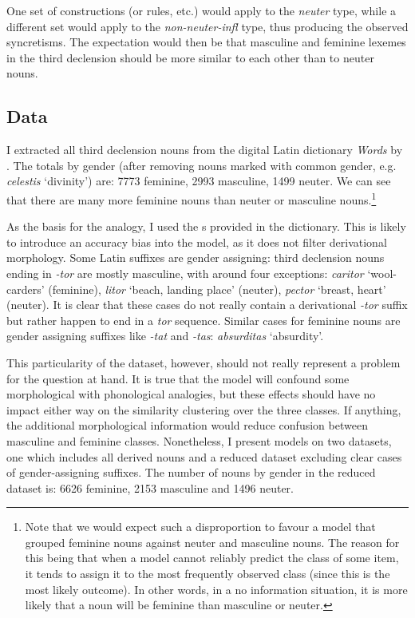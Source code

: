 One set of constructions (or rules, etc.) would apply to the \textit{neuter} type, while a different set would apply to the \textit{non-neuter-infl} type, thus producing the observed syncretisms. The expectation would then be that masculine and feminine lexemes in the third declension should be more similar to each other than to neuter nouns.

\subsection{Data}

I extracted all third declension nouns from the digital Latin dictionary \textit{Words} by \textcite{Whitaker.}. The totals by gender (after removing nouns marked with common gender, e.g. \textit{celestis} `divinity') are: 7773 feminine, 2993 masculine, 1499 neuter. We can see that there are many more feminine nouns than neuter or masculine nouns.\footnote{Note that we would expect such a disproportion to favour a model that grouped feminine nouns against neuter and masculine nouns. The reason for this being that when a model cannot reliably predict the class of some item, it tends to assign it to the most frequently observed class (since this is the most likely outcome). In other words, in a no information situation, it is more likely that a noun will be feminine than masculine or neuter.}

As the basis for the analogy, I used the s provided in the dictionary. This is likely to introduce an accuracy bias into the model, as it does not filter derivational morphology. Some Latin suffixes are gender assigning: third declension nouns ending in \textit{-tor} are mostly masculine, with around four exceptions: \textit{caritor} `wool-carders' (feminine), \textit{litor} `beach, landing place' (neuter),  \textit{pector} `breast, heart' (neuter). It is clear that these cases do not really contain a derivational \textit{-tor} suffix but rather happen to end in a \textit{tor} sequence. Similar cases for feminine nouns are gender assigning suffixes like \textit{-tat} and \textit{-tas}: \textit{absurditas} `absurdity'.

This particularity of the dataset, however, should not really represent a problem for the question at hand. It is true that the model will confound some morphological with phonological analogies, but these effects should have no impact either way on the similarity clustering over the three classes. If anything, the additional morphological information would reduce confusion between masculine and feminine classes. Nonetheless, I present models on two datasets, one which includes all derived nouns and a reduced dataset excluding clear cases of gender-assigning suffixes. The number of nouns by gender in the reduced dataset is: 6626 feminine, 2153 masculine and 1496 neuter.

